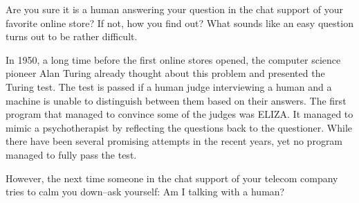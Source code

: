 
Are you sure it is a human answering your question in the chat support of your favorite online store? If not, how you find out? What sounds like an easy question turns out to be rather difficult.

In 1950, a long time before the first online stores opened, the computer science pioneer Alan Turing already thought about this problem and presented the Turing test. The test is passed if a human judge interviewing a human and a machine is unable to distinguish between them based on their answers. The first program that managed to convince some of the judges was ELIZA. It managed to mimic a psychotherapist by reflecting the questions back to the questioner. While there have been several promising attempts in the recent years, yet no program managed to fully pass the test.

However, the next time someone in the chat support of your telecom company tries to calm you down--ask yourself: Am I talking with a human?

